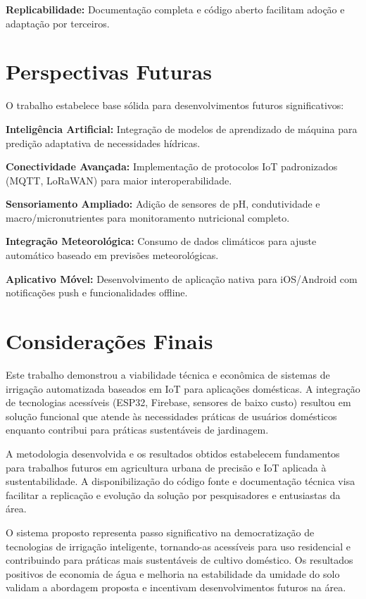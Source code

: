 \documentclass[twoside,english,brazilian]{UNISINOSmonografia}
\begin{document}
\textbf{Replicabilidade:} Documentação completa e código aberto facilitam adoção e adaptação por terceiros.

\section{Perspectivas Futuras}

O trabalho estabelece base sólida para desenvolvimentos futuros significativos:

\textbf{Inteligência Artificial:} Integração de modelos de aprendizado de máquina para predição adaptativa de necessidades hídricas.

\textbf{Conectividade Avançada:} Implementação de protocolos IoT padronizados (MQTT, LoRaWAN) para maior interoperabilidade.

\textbf{Sensoriamento Ampliado:} Adição de sensores de pH, condutividade e macro/micronutrientes para monitoramento nutricional completo.

\textbf{Integração Meteorológica:} Consumo de dados climáticos para ajuste automático baseado em previsões meteorológicas.

\textbf{Aplicativo Móvel:} Desenvolvimento de aplicação nativa para iOS/Android com notificações push e funcionalidades offline.

\section{Considerações Finais}

Este trabalho demonstrou a viabilidade técnica e econômica de sistemas de irrigação automatizada baseados em IoT para aplicações domésticas. A integração de tecnologias acessíveis (ESP32, Firebase, sensores de baixo custo) resultou em solução funcional que atende às necessidades práticas de usuários domésticos enquanto contribui para práticas sustentáveis de jardinagem.

A metodologia desenvolvida e os resultados obtidos estabelecem fundamentos para trabalhos futuros em agricultura urbana de precisão e IoT aplicada à sustentabilidade. A disponibilização do código fonte e documentação técnica visa facilitar a replicação e evolução da solução por pesquisadores e entusiastas da área.

O sistema proposto representa passo significativo na democratização de tecnologias de irrigação inteligente, tornando-as acessíveis para uso residencial e contribuindo para práticas mais sustentáveis de cultivo doméstico. Os resultados positivos de economia de água e melhoria na estabilidade da umidade do solo validam a abordagem proposta e incentivam desenvolvimentos futuros na área.
\end{document}
